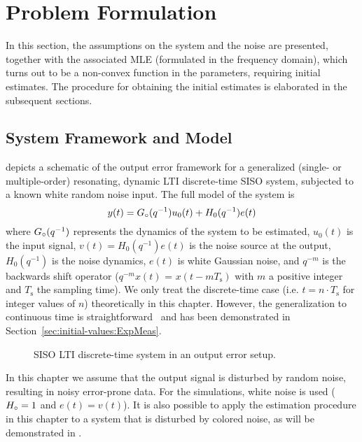 \section{Problem Formulation}
\label{sec:initial-values:ProbForm}

In this section, the assumptions on the system and the noise are presented, together with the associated MLE (formulated in the frequency domain), which turns out to be a non-convex function in the parameters, requiring initial estimates. The procedure for obtaining the initial estimates is elaborated in the subsequent sections.

\subsection{System Framework and Model}
 depicts a schematic of the output error framework for  a generalized (single- or multiple-order) resonating, dynamic \gls{LTI} discrete-time \gls{SISO} system, subjected to a known white random noise input. 
The full model of the system is
\begin{equation}
y(t)={G}_{\circ}(q^{-1})u_0(t)+H_0(q^{-1})e(t)
\label{eq:initial-values:OE:TD}
\end{equation}
where ${G}_{\circ}(q^{-1})$ represents the dynamics of the system to be estimated, $u_0(t)$ is the input signal, $v(t)= H_0(q^{-1})e(t)$ is the noise source at the output, $H_0(q^{-1})$ is the noise dynamics, 
$e(t)$ is white Gaussian noise, and $q^{-m}$ is the backwards shift operator ($q^{-m}x(t)$ = $x(t-mT_{\mathrm{s}})$  with $m$ a positive integer and $T_{\mathrm{s}}$ the sampling time).
We only treat the discrete-time case (i.e. $t = n \cdot T_{\mathrm{s}}$ for integer values of $n$) theoretically in this chapter.
However, the generalization to continuous time is straightforward~\citep[Chapter 6]{Pintelon2012} and has been demonstrated in Section~\ref{sec:initial-values:ExpMeas}.

\begin{figure}[tbh]
\centering

\caption[Output-error set-up.]{SISO LTI discrete-time system in an output error setup.}
\label{fig:oesetup}
\end{figure}

In this chapter we assume that the output signal is disturbed by random noise, resulting in noisy error-prone data.
For the simulations, white noise is used (${H}_{\circ} = 1$ and $e(t) = v(t)$).
It is also possible to apply the estimation procedure in this chapter to a system that is disturbed by colored noise, as will be demonstrated in . 

